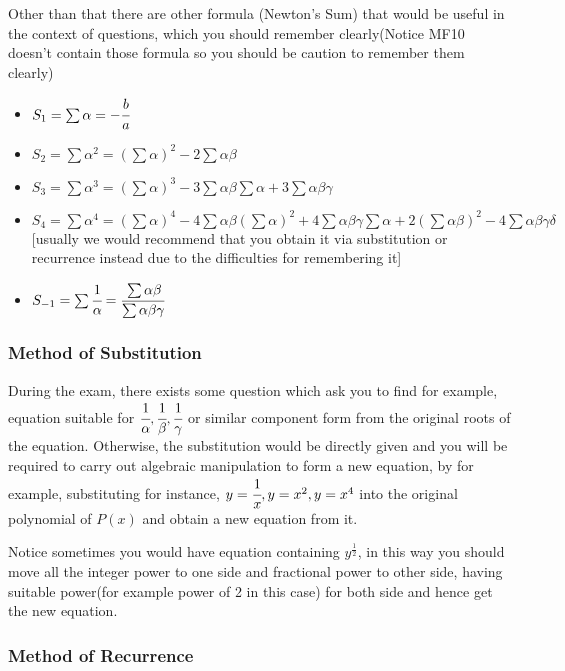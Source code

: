\documentclass[]{article}
\begin{document}
Other than that there are other formula (Newton's Sum) that would be
useful in the context of questions, which you should remember
clearly(Notice MF10 doesn't contain those formula so you should be
caution to remember them clearly)

\begin{itemize}
\item
  \(S_1 = \sum \alpha = -\cfrac{b}{a}\)
\item
  \(S_2 = \sum{\alpha}^2 = (\sum \alpha)^2 - 2\sum \alpha \beta\)
\item
  \(S_3=\sum \alpha^3 = (\sum \alpha)^3 - 3\sum \alpha \beta\sum\alpha+3\sum \alpha\beta\gamma\)
\item
  \(S_4=\sum \alpha^4  = (\sum \alpha)^4 - 4\sum \alpha\beta(\sum \alpha)^2 +4\sum\alpha\beta\gamma\sum\alpha+2(\sum\alpha\beta)^2 - 4\sum\alpha\beta\gamma\delta\)
  {[}usually we would recommend that you obtain it via substitution or
  recurrence instead due to the difficulties for remembering it{]}
\item
  \( S_{-1}=\sum \cfrac{1}{\alpha} = \cfrac{\sum \alpha \beta}{\sum \alpha \beta\gamma}\)
\end{itemize}

\subsubsection{Method of Substitution}\label{header-n231}

During the exam, there exists some question which ask you to find for
example, equation suitable for
\(\cfrac{1}{\alpha},\cfrac{1}{\beta},\cfrac{1}{\gamma}\) or similar
component form from the original roots of the equation. Otherwise, the
substitution would be directly given and you will be required to carry
out algebraic manipulation to form a new equation, by for example,
substituting for instance, \(y = \cfrac{1}{x}, y = x^2,  y = x^4\) into
the original polynomial of \(P(x)\) and obtain a new equation from it.

Notice sometimes you would have equation containing \(y^\frac{1}{2}\),
in this way you should move all the integer power to one side and
fractional power to other side, having suitable power(for example power
of 2 in this case) for both side and hence get the new equation.

\subsubsection{Method of Recurrence}\label{header-n234}
\end{document}
